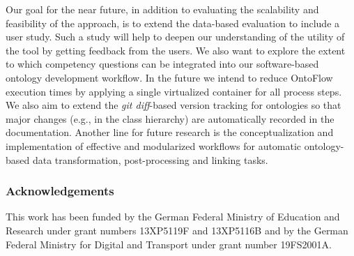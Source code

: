 \documentclass[runningheads]{llncs}
\begin{document}
Our goal for the near future, in addition to evaluating the scalability and feasibility of the approach, is to extend the data-based evaluation to include a user study. Such a study will help to deepen our understanding of the utility of the tool by getting feedback from the users. We also want to explore the extent to which competency questions can be integrated into our software-based ontology development workflow.
In the future we intend to reduce OntoFlow execution times by applying a single virtualized container for all process steps.
We also aim to extend the \textit{git diff}-based version tracking for ontologies so that major changes (e.g., in the class hierarchy) are automatically recorded in the documentation. Another line for future research is the conceptualization and implementation of effective and modularized workflows for automatic ontology-based data transformation, post-processing and linking tasks.

%
%
% 
% 



%
%
\subsubsection*{Acknowledgements}

This work has been funded by the German Federal Ministry of Education and Research under grant numbers 13XP5119F and 13XP5116B and by the German Federal Ministry for Digital and Transport under grant number 19FS2001A.
\end{document}
